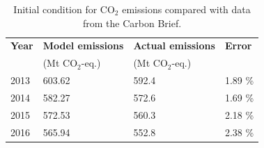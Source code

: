 \begin{table}[H]
\centering
	\caption{Initial condition for CO$_2$ emissions compared with data from the Carbon Brief\cite{carbonbrief_carbon_2018}.}
	\vspace{0.1in}
	\begin{tabularx}{0.55\textwidth}{p{} p{} p{} p{}}
		\hline
\textbf{Year} & \textbf{Model emissions} & \textbf{Actual emissions} & \textbf{Error} \\
  & (Mt CO$_2$-eq.) & (Mt CO$_2$-eq.) &  \\
\hline
2013 & 603.62 & 592.4 & 1.89 \% \\
2014 & 582.27 & 572.6 & 1.69 \% \\
2015 & 572.53 & 560.3 & 2.18 \% \\
2016 & 565.94 & 552.8 & 2.38 \% \\
\hline 
	\end{tabularx}
\label{ic-co2}
\end{table}


